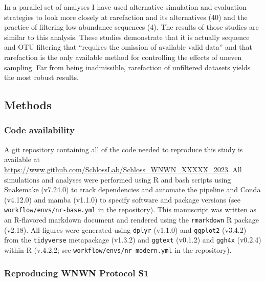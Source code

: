 \documentclass[
]{article}
\begin{document}
In a parallel set of analyses I have used alternative simulation and
evaluation strategies to look more closely at rarefaction and its
alternatives (40) and the practice of filtering low abundance sequences
(4). The results of those studies are similar to this analysis. These
studies demonstrate that it is actually sequence and OTU filtering that
``requires the omission of available valid data'' and that rarefaction
is the only available method for controlling the effects of uneven
sampling. Far from being inadmissible, rarefaction of unfiltered
datasets yields the most robust results.

\hypertarget{methods}{%
\subsection{Methods}\label{methods}}

\hypertarget{code-availability}{%
\subsubsection{Code availability}\label{code-availability}}

A git repository containing all of the code needed to reproduce this
study is available at
\url{https://www.github.com/SchlossLab/Schloss_WNWN_XXXXX_2023}. All
simulations and analyses were performed using R and bash scripts using
Snakemake (v7.24.0) to track dependencies and automate the pipeline and
Conda (v4.12.0) and mamba (v1.1.0) to specify software and package
versions (see \texttt{workflow/envs/nr-base.yml} in the repository).
This manuscript was written as an R-flavored markdown document and
rendered using the \texttt{rmarkdown} R package (v2.18). All figures
were generated using \texttt{dplyr} (v1.1.0) and \texttt{ggplot2}
(v3.4.2) from the \texttt{tidyverse} metapackage (v1.3.2) and
\texttt{ggtext} (v0.1.2) and \texttt{ggh4x} (v0.2.4) within R (v.4.2.2;
see \texttt{workflow/envs/nr-modern.yml} in the repository).

\hypertarget{reproducing-wnwn-protocol-s1}{%
\subsubsection{Reproducing WNWN Protocol
S1}\label{reproducing-wnwn-protocol-s1}}
\end{document}
